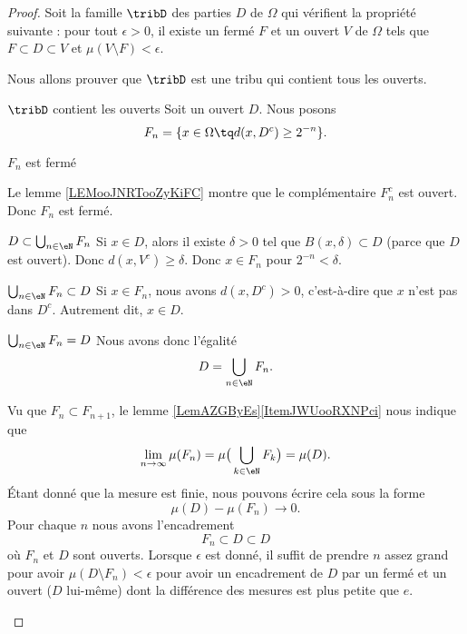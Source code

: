 \begin{proof}
    Soit la famille \( \tribD\) des parties \( D\) de \( \Omega\) qui vérifient la propriété suivante : pour tout \( \epsilon>0\), il existe un fermé \( F\) et un ouvert \( V\) de \( \Omega\) tels que \( F\subset D\subset V\) et \( \mu(V\setminus F)<\epsilon\).

    Nous allons prouver que \( \tribD\) est une tribu qui contient tous les ouverts.

    \begin{subproof}
        \item[\( \tribD\) contient les ouverts]
            Soit un ouvert \( D\). Nous posons
            \begin{equation}
                F_n=\{ x\in \Omega\tq d(x,D^c)\geq 2^{-n} \}.
            \end{equation}
            \begin{subproof}
                \item[\( F_n\) est fermé]
                
                    Le lemme \ref{LEMooJNRTooZyKiFC} montre que le complémentaire \( F_n^c\) est ouvert. Donc \( F_n\) est fermé.
                \item[\( D\subset \bigcup_{n\in \eN}F_n\)]
                    Si \( x\in D\), alors il existe \( \delta>0\) tel que \( B(x,\delta)\subset D\) (parce que \( D\) est ouvert). Donc \( d(x,V^c)\geq \delta\). Donc \( x\in F_n\) pour \( 2^{-n}<\delta\).
                \item[\( \bigcup_{n\in \eN}F_n\subset D\)]
                    Si \( x\in F_n\), nous avons \( d(x,D^c)>0\), c'est-à-dire que \( x\) n'est pas dans \( D^c\). Autrement dit, \( x\in D\).
                \item[\( \bigcup_{n\in \eN}F_n = D\)]
                    Nous avons donc l'égalité
                    \begin{equation}
                        D=\bigcup_{n\in \eN}F_n.
                    \end{equation}
            \end{subproof}
            Vu que \( F_n\subset F_{n+1}\), le lemme \ref{LemAZGByEs}\ref{ItemJWUooRXNPci} nous indique que
            \begin{equation}
                \lim_{n\to \infty} \mu(F_n)=\mu\big( \bigcup_{k\in \eN}F_k \big)=\mu(D).
            \end{equation}
            Étant donné que la mesure est finie, nous pouvons écrire cela sous la forme
            \begin{equation}
                \mu(D)-\mu(F_n)\to 0.
            \end{equation}
            Pour chaque \( n\) nous avons l'encadrement
            \begin{equation}
                F_n\subset D\subset D
            \end{equation}
            où \( F_n\) et \( D\) sont ouverts. Lorsque \( \epsilon\) est donné, il suffit de prendre \( n\) assez grand pour avoir \( \mu(D\setminus F_n)<\epsilon\) pour avoir un encadrement de \( D\) par un fermé et un ouvert (\( D\) lui-même) dont la différence des mesures est plus petite que \( e\).


\end{subproof}
\end{proof}
